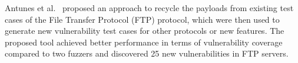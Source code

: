 Antunes et al.~\cite{Antunes:issre2012:recycling} proposed an approach to recycle the payloads from existing test cases of the File Transfer Protocol (FTP) protocol, which were then used to generate new vulnerability test cases for other protocols or new features. The proposed tool achieved better performance in terms of vulnerability coverage compared to two fuzzers and discovered 25 new vulnerabilities in FTP servers.

